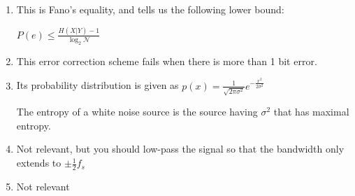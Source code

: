 


\begin{enumerate}[label=(\alph*)]

  \item
    This is Fano's equality, and tells us the following lower bound:

    $P(e) \leq \frac{H(X|Y) - 1}{\log_2{\mathcal{N}}}$

  \item
    This error correction scheme fails when there is more than 1 bit error.

  \item
    Its probability distribution is given as $p(x) = \frac{1}{\sqrt{2\pi\sigma^2}}e^{-\frac{x^2}{2\sigma^2}}$

    The entropy of a white noise source is the source having $\sigma^2$ that has maximal entropy.

  \item
    Not relevant, but you should low-pass the signal so that the bandwidth only extends to $\pm \frac{1}{2}f_s$

  \item
    Not relevant

    \end{enumerate}


